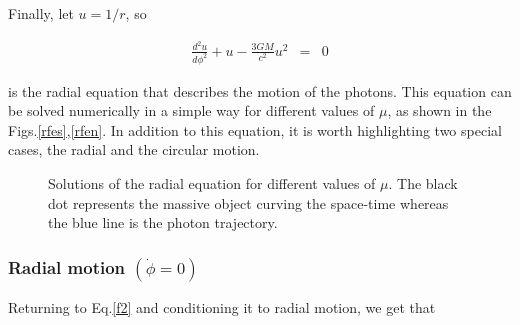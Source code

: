 \documentclass[letterpaper,11pt,onecolumn]{article}
\begin{document}
Finally, let $u=1/r$, so 

\begin{eqnarray}
    \frac{d^{2}u}{d\phi^{2}}+u-\frac{3GM}{c^{2}}u^{2}&=&0 \label{fr}
\end{eqnarray}

is the radial equation that describes the motion of the photons. This equation can be solved numerically in a simple way for different values of $\mu$, as shown in the Figs.\ref{rfes},\ref{rfen}. In addition to this equation, it is worth highlighting two special cases, the radial  and the circular motion. 

\begin{figure}[h!]
\centering
{}
\caption{Solutions of the radial equation for different values of $\mu$. The black dot represents the massive object curving the space-time whereas the blue line is the photon trajectory.}
\end{figure}

\subsubsection{Radial motion $(\dot{\phi}=0)$} \label{sec_rad_phot}

Returning to Eq.\ref{f2} and conditioning it to radial motion, we get that
\end{document}
